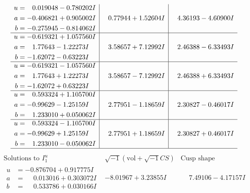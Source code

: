 \documentclass[1p]{elsarticle_modified}
\theoremstyle{definition}
\newcommand{\I}{\sqrt{-1}}
\begin{document}
$$\begin{array}{c|c|c}
\begin{aligned}
u &= \phantom{-}0.019048 - 0.780202 I \\
a &= -0.406821 + 0.905002 I \\
b &= -0.275945 - 0.814062 I\end{aligned}
 & \phantom{-}0.77944 + 1.52604 I & \phantom{-}4.36193 - 4.60900 I \\ \hline\begin{aligned}
u &= -0.619321 + 1.057560 I \\
a &= \phantom{-}1.77643 - 1.22273 I \\
b &= -1.62072 - 0.63223 I\end{aligned}
 & \phantom{-}3.58657 + 7.12992 I & \phantom{-}2.46388 - 6.33493 I \\ \hline\begin{aligned}
u &= -0.619321 - 1.057560 I \\
a &= \phantom{-}1.77643 + 1.22273 I \\
b &= -1.62072 + 0.63223 I\end{aligned}
 & \phantom{-}3.58657 - 7.12992 I & \phantom{-}2.46388 + 6.33493 I \\ \hline\begin{aligned}
u &= \phantom{-}0.593324 + 1.105700 I \\
a &= -0.99629 - 1.25159 I \\
b &= \phantom{-}1.233010 + 0.050062 I\end{aligned}
 & \phantom{-}2.77951 - 1.18659 I & \phantom{-}2.30827 - 0.46017 I \\ \hline\begin{aligned}
u &= \phantom{-}0.593324 - 1.105700 I \\
a &= -0.99629 + 1.25159 I \\
b &= \phantom{-}1.233010 - 0.050062 I\end{aligned}
 & \phantom{-}2.77951 + 1.18659 I & \phantom{-}2.30827 + 0.46017 I\\
 \hline 
 \end{array}$$\newpage$$\begin{array}{c|c|c}  
\text{Solutions to }I^u_{1}& \I (\text{vol} + \sqrt{-1}CS) & \text{Cusp shape}\\
 \hline 
\begin{aligned}
u &= -0.876704 + 0.917775 I \\
a &= \phantom{-}0.013016 + 0.303072 I \\
b &= \phantom{-}0.533786 + 0.030166 I\end{aligned}
 & -8.01967 + 3.23855 I & \phantom{-}7.49106 - 4.17157 I \\ \hline\begin{aligned}

\end{aligned}
\end{array}$$
\end{document}
